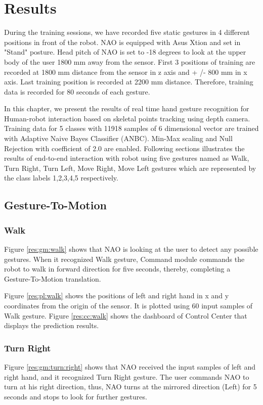 \chapter{Results} \label{ch:result} During the training sessions, we have recorded five static gestures in 4 different positions in front of the robot. NAO is equipped with Asus Xtion and set in "Stand" posture. Head pitch of NAO is set to -18 degrees to look at the upper body of the user 1800 mm away from the sensor. First 3 positions of training are recorded at 1800 mm distance from the sensor in z axis and + /- 800 mm in x axis. Last training position is recorded at 2200 mm distance. Therefore, training data is recorded for 80 seconds of each gesture.

In this chapter, we present the results of real time hand gesture recognition for Human-robot interaction based on skeletal points tracking using depth camera. Training data for 5 classes with 11918 samples of 6 dimensional vector are trained with Adaptive Naive Bayes Classifier (ANBC). Min-Max scaling and Null Rejection with coefficient of 2.0 are enabled. Following sections illustrates the results of end-to-end interaction with robot using five gestures named as Walk, Turn Right, Turn Left, Move Right, Move Left gestures which are represented by the class labels 1,2,3,4,5 respectively.


\section{Gesture-To-Motion} 
\subsection{Walk} Figure \ref{res:gm:walk} shows that NAO is looking at the user to detect any possible gestures. When it recognized Walk gesture, Command module commands the robot to walk in forward direction for five seconds, thereby, completing a Gesture-To-Motion translation.



Figure \ref{res:pl:walk} shows the positions of left and right hand in x and y coordinates from the origin of the sensor. It is plotted using 60 input samples of Walk gesture. Figure \ref{res:cc:walk} shows the dashboard of Control Center that displays the prediction results. 

\clearpage 
\subsection{Turn Right} Figure \ref{res:gm:turn:right} shows that NAO received the input samples of left and right hand, and it recognized Turn Right gesture. The user commands NAO to turn at his right direction, thus, NAO turns at the mirrored direction (Left) for 5 seconds and stops to look for further gestures.

